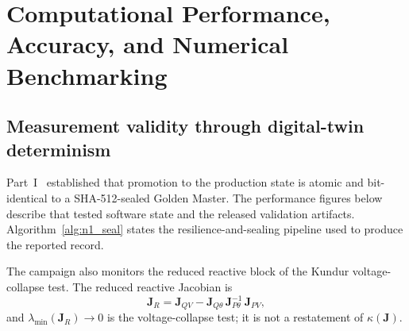 \section{Computational Performance, Accuracy, and Numerical Benchmarking}
\label{sec:benchmarking}

\subsection{Measurement validity through digital-twin determinism}
\label{sub:determinism}

Part~I~\cite{seni142part1} established that promotion to the production state is atomic and bit-identical to a SHA-512-sealed Golden Master. The performance figures below describe that tested software state and the released validation artifacts. Algorithm~\ref{alg:n1_seal} states the resilience-and-sealing pipeline used to produce the reported record.

The campaign also monitors the reduced reactive block of the Kundur voltage-collapse test. The reduced reactive Jacobian is
\begin{equation}
\mathbf{J}_R = \mathbf{J}_{QV} - \mathbf{J}_{Q\theta}\, \mathbf{J}_{P\theta}^{-1}\, \mathbf{J}_{PV},
\label{eq:jr}
\end{equation}
and $\lambda_{\min}(\mathbf{J}_R)\to 0$ is the voltage-collapse test; it is not a restatement of $\kappa(\mathbf{J})$.

